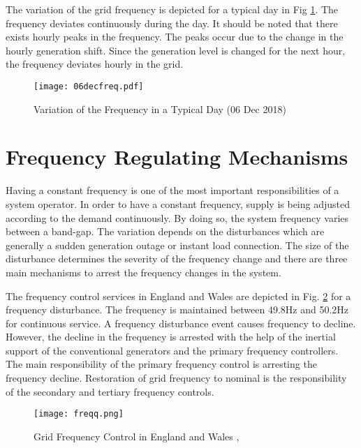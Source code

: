 The variation of the grid frequency is depicted for a typical day in Fig \ref{06decfreq}. The frequency deviates continuously during the day. It should be noted that there exists hourly peaks in the frequency. The peaks occur due to the change in the hourly generation shift. Since the generation level is changed for the next hour, the frequency deviates hourly in the grid.
\begin{figure}[h!]
	\centering
	\texttt{[image: 06decfreq.pdf]}
	\caption{Variation of the Frequency in a Typical Day (06 Dec 2018) \cite{teiasfreq}}
	\label{06decfreq}
\end{figure}
\section{Frequency Regulating Mechanisms}
Having a constant frequency is one of the most important responsibilities of a system operator. In order to have a constant frequency, supply is being adjusted according to the demand continuously. By doing so, the system frequency varies between a band-gap. The variation depends on the disturbances which are generally a sudden generation outage or instant load connection. The size of the disturbance determines the severity of the frequency change and there are three main mechanisms to arrest the frequency changes in the system. \par
The frequency control services in England and Wales are depicted in Fig. \ref{freqcontrol} for a frequency disturbance. The frequency is maintained between 49.8Hz and 50.2Hz for continuous service. A frequency disturbance event causes frequency to decline. However, the decline in the frequency is arrested with the help of the inertial support of the conventional generators and the primary frequency controllers. The main responsibility of the primary frequency control is arresting the frequency decline. Restoration of grid frequency to nominal is the responsibility of the secondary and tertiary frequency controls.
\begin{figure}[h!]
	\centering
	\texttt{[image: freqq.png]}
	\caption{Grid Frequency Control in England and Wales \cite{Ekanayake2008}, \cite{Erinmez1999}}
	\label{freqcontrol}
\end{figure}
